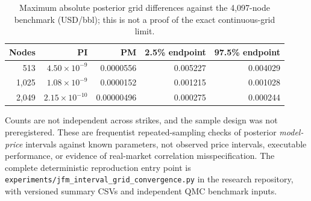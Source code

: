 \documentclass[10pt]{article}
\renewcommand{\thetable}{S\arabic{section}}
\begin{document}
\begin{table}[htbp]\centering\small
\renewcommand{\thetable}{S5b}
\caption{Maximum absolute posterior grid differences against the
4,097-node benchmark (USD/bbl); this is not a proof of the exact
continuous-grid limit.}\label{tab:s5b}
\begin{tabular}{rrrrr}\toprule
Nodes & PI & PM & 2.5\% endpoint & 97.5\% endpoint\\\midrule
513 & $4.50\times10^{-9}$ & 0.0000556 & 0.005227 & 0.004029\\
1,025 & $1.08\times10^{-9}$ & 0.0000152 & 0.001215 & 0.001028\\
2,049 & $2.15\times10^{-10}$ & 0.00000496 & 0.000275 & 0.000244\\\bottomrule
\end{tabular}
\end{table}

\noindent Counts are not independent across strikes, and the sample design
was not preregistered. These are frequentist repeated-sampling
checks of posterior \emph{model-price} intervals against known
parameters, not observed price intervals, executable performance,
or evidence of real-market correlation misspecification.
The complete deterministic reproduction entry point is
\texttt{experiments/jfm\_interval\_grid\_convergence.py} in the
research repository, with versioned summary CSVs and independent
QMC benchmark inputs.
\end{document}
